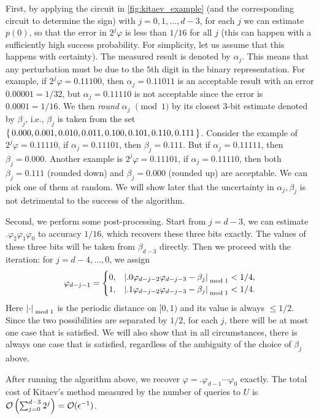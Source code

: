 First, by applying the circuit in \cref{fig:kitaev_example} (and the corresponding circuit to determine the sign) with $j=0,1,\ldots,d-3$, for each $j$ we can estimate $p(0)$, so that the error in $2^j\varphi$ is less than $1/16$ for all $j$ (this can happen with a sufficiently high success probability. For simplicity, let us assume that this happens with certainty).
The measured result is denoted by $\alpha_j$. 
This means that any perturbation must be due to the $5$th digit in the binary representation. For example, if $2^j\varphi=0.11100$, then $\alpha_j=0.11011$ is an acceptable result with an error $0.00001=1/32$, but $\alpha_j=0.11110$ is not acceptable since the error is $0.0001=1/16$. We then \textit{round} $\alpha_j$ $\pmod 1$ by its closest $3$-bit estimate denoted by $\beta_j$, i.e., $\beta_j$ is taken from the set $\set{0.000,0.001,0.010,0.011,0.100,0.101,0.110,0.111}$.  Consider the example of $2^j\varphi=0.11110$, if $\alpha_j=0.11101$, then $\beta_j=0.111$. But if $\alpha_j=0.11111$, then $\beta_j=0.000$. 
Another example is $2^j\varphi=0.11101$, if $\alpha_j=0.11110$, then both $\beta_j=0.111$ (rounded down) and $\beta_j=0.000$ (rounded up) are acceptable. We can pick one of them at random. We will show later that the uncertainty in $\alpha_j,\beta_j$ is not detrimental to the success of the algorithm.

Second, we perform some post-processing. Start from $j=d-3$, we can estimate $.\varphi_2\varphi_1\varphi_0$ to accuracy $1/16$, which recovers these three bits exactly.  The values of these three bits will be taken from $\beta_{d-3}$ directly. Then we proceed with the iteration: for $j=d-4,\ldots,0$, we assign
\begin{equation}\label{eqn:kitaev_decidephi}
\varphi_{d-j-1}=\begin{cases}
0,& \left\lvert.0\varphi_{d-j-2}\varphi_{d-j-3}-\beta_j\right\rvert_{\bmod 1}<1/4,\\
1,& \left\lvert.1\varphi_{d-j-2}\varphi_{d-j-3}-\beta_j\right\rvert_{\bmod 1}<1/4.
\end{cases}
\end{equation}
Here $\left\lvert\cdot\right\rvert_{\bmod 1}$ is the periodic distance on $[0,1)$ and its value is always $\le 1/2$. 
Since the two possibilities are separated by $1/2$, for each $j$, there will be at most one case that is satisfied. We will also show that in all circumstances, there is always one case that is satisfied, regardless of the ambiguity of the choice of $\beta_j$ above.

After running the algorithm above, we recover $\varphi=.\varphi_{d-1}\cdots \varphi_0$ exactly. The total cost of Kitaev's method measured by the number of queries to $U$ is $\mathcal{O}\left(\sum_{j=0}^{d-3} 2^{j}\right)=\mathcal{O}(\epsilon^{-1})$.

